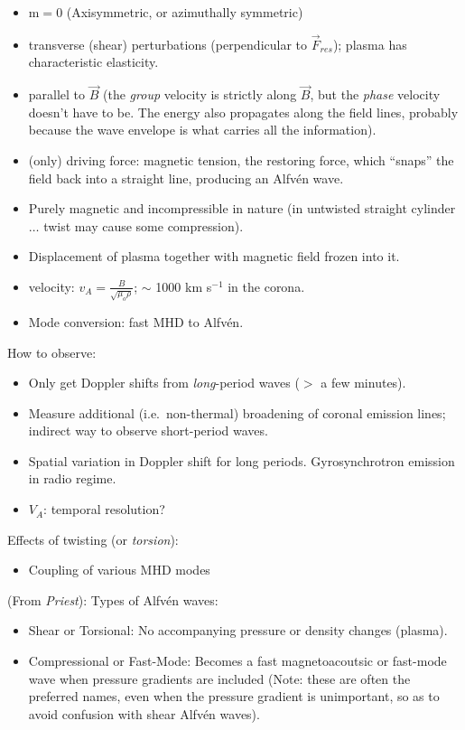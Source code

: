\documentclass{article}
\begin{document}
\begin{itemize}
    \item m$=$0 (Axisymmetric, or azimuthally symmetric)
    \item transverse (shear) perturbations (perpendicular to $\vec{F}_{res}$);
        plasma has characteristic elasticity.
    \item parallel to $\vec{B}$ (the \emph{group} velocity  is strictly along
        ${\vec{B}}$, but the \emph{phase} velocity doesn't have to be. The
        energy also propagates along the field lines, probably because the
        wave envelope is what carries all the information).
    \item (only) driving force: magnetic tension, the restoring force,
        which ``snaps'' the field back
        into a straight line, producing an Alfv\'en wave.
    \item Purely magnetic and incompressible in nature (in untwisted straight
        cylinder$\ldots$ twist may cause some compression).
    \item Displacement of plasma together with magnetic field frozen
        into it.
    \item velocity: $v_{A} = \frac{B}{\sqrt{\mu_{o}\rho}}$;
        $\sim$ 1000 km s$^{-1}$ in the corona.
    \item Mode conversion: fast MHD to Alfv\'en.
\end{itemize}
How to observe:
\begin{itemize}
    \item Only get Doppler shifts from \emph{long}-period waves
        ($>$ a few minutes).
    \item Measure additional (i.e.\ non-thermal) broadening
        of coronal emission lines; indirect way to observe short-period waves.
    \item Spatial variation in Doppler shift for long periods.
        Gyrosynchrotron emission in radio regime.
    \item $V_A$: temporal resolution?
\end{itemize}
Effects of twisting (or \emph{torsion}):
\begin{itemize}
    \item Coupling of various MHD modes
\end{itemize}

(From \emph{Priest}): Types of Alfv\'en waves:
\begin{itemize}
    \item Shear or Torsional: No accompanying pressure or
        density changes (plasma).
    \item Compressional or Fast-Mode: Becomes a fast
        magnetoacoutsic or fast-mode wave when pressure gradients
        are included (Note: these are often the preferred names,
        even when the pressure gradient is unimportant, so as to
        avoid confusion with shear Alfv\'en waves).
\end{itemize}
\end{document}
